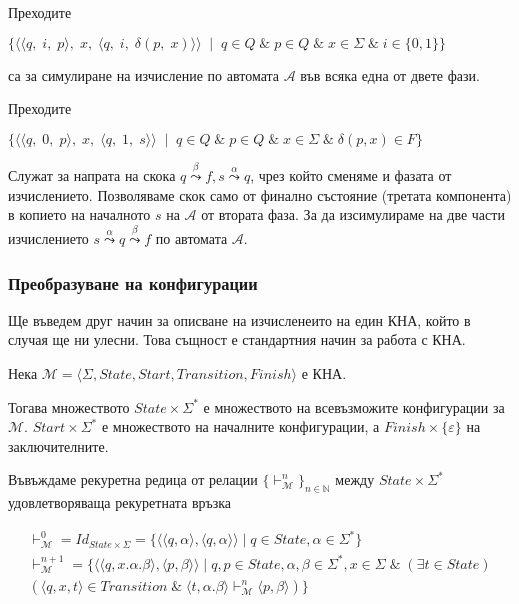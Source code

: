 \documentclass[12pt]{article}
\begin{document}
Преходите

\(\{ \langle \langle q,\; i,\;p \rangle,\; x,\; \langle q,\; i,\; \delta(p,\; x) \rangle \rangle \;\mid\; q \in Q \;\&\; p \in Q \;\&\; x \in \Sigma \;\&\; i \in \{0, 1\} \}\)

са за симулиране на изчисление по автомата \(\mathcal A\) във всяка една от двете фази.

Преходите

\(\{ \langle \langle q,\; 0,\; p \rangle,\; x,\; \langle q,\; 1,\; s \rangle \rangle \;\mid\; q \in Q \;\&\; p \in Q \;\&\; x \in \Sigma \;\&\; \delta(p, x) \in F\} \)

Служат за напрата на скока \(q \overset{\beta}{\leadsto} f, s \overset{\alpha}{\leadsto} q \), чрез който сменяме и фазата от изчислението. Позволяваме скок само от финално състояние (третата компонента) в копието на началното \(s\) на \(\mathcal A\) от втората фаза.
За да изсимулираме на две части изчислението \(s \overset{\alpha}{\leadsto} q \overset{\beta}{\leadsto} f\) по автомата \(\mathcal A\).

\subsubsection*{Преобразуване на конфигурации}
Ще въведем друг начин за описване на изчисленеито на един КНА, който в случая ще ни улесни. Това същност е стандартния начин за работа с КНА.

Нека \(\mathcal M = \langle \Sigma, State, Start, Transition, Finish  \rangle\) е КНА.

Тогава множеството \(State \times \Sigma^*\) е множеството на всевъзможите конфигурации за \(\mathcal M\).
\(Start \times \Sigma^*\) е множеството на началните конфигурации, а \(Finish \times \{\varepsilon\}\) на заключителните.

Въвъждаме рекуретна редица от релации \(\{ \vdash_{\mathcal M}^n \}_{n \in \mathbb N}\) между \(State \times \Sigma^*\) удовлетворяваща рекуретната връзка

\begin{align*}
    \vdash_{\mathcal M}^0 = Id_{State \times \Sigma} = \{\langle \langle q, \alpha \rangle, \langle q, \alpha \rangle \rangle \mid q \in State, \alpha \in \Sigma^*\} \\
    \vdash_{\mathcal M}^{n + 1} = \{\langle \langle q, x.\alpha.\beta \rangle, \langle p, \beta \rangle \rangle \mid q, p \in State, \alpha, \beta \in \Sigma^*, x \in \Sigma \;\&\;  (\exists t \in State) \\ ( \langle q, x, t \rangle \in Transition \;\&\; \langle t, \alpha.\beta \rangle \vdash_{\mathcal M}^n \langle p, \beta \rangle )\}
\end{align*}
\end{document}
